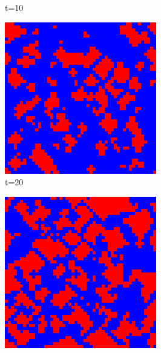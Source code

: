 \documentclass[a4paper, 11pt]{article}
\begin{document}
\begin{figure}[H]
\begin{subfigure}{.25\textwidth}
  \caption{t=10}
\end{subfigure}
\begin{subfigure}{.25\textwidth}
  \centering
  \includegraphics[width=0.9\linewidth]{PRISONERS_DILEMMA_VON_NEUMANN_50x50_t20}
  \caption{t=20}
\end{subfigure}%
\begin{subfigure}{.25\textwidth}
  \centering
  \includegraphics[width=0.9\linewidth]{PRISONERS_DILEMMA_VON_NEUMANN_50x50_t50}

\end{subfigure}
\end{figure}
\end{document}
